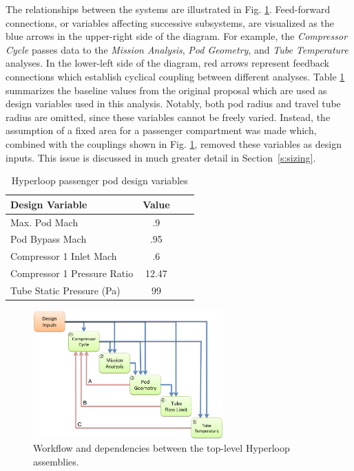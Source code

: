 \documentclass[heading.tex]{subfiles}
\begin{document}
The relationships between the systems are illustrated in Fig. \ref{f:hyperloopXDSM}. 
Feed-forward connections, or variables affecting successive subsystems,
are visualized as the blue arrows in the upper-right side of the diagram.
For example, the \textit{Compressor Cycle} passes data to the \textit{Mission Analysis},
\textit{Pod Geometry}, and \textit{Tube Temperature} analyses.
In the lower-left side of the diagram, red arrows represent feedback connections which establish cyclical coupling between different analyses.
Table \ref{tab:desvars} summarizes the baseline values from the original proposal which are used as design variables used in this analysis.
Notably, both pod radius and travel tube radius are omitted, since these variables cannot be freely varied.
Instead, the assumption of a fixed area for a passenger compartment was made which,
combined with the couplings shown in Fig. \ref{f:hyperloopXDSM}, removed these variables as design inputs.
This issue is discussed in much greater detail in Section~\ref{s:sizing}.

\begin{table}
    \centering
    \caption{Hyperloop passenger pod design variables}
    \label{tab:desvars}
    \begin{tabular}{l  c  c  c} 
        \hline \hline
        Design Variable &  Value\\ \hline \hline
        Max. Pod Mach & .9 \\ 
        Pod Bypass Mach & .95\\
        Compressor 1 Inlet Mach & .6\\ 
        Compressor 1 Pressure Ratio & 12.47\\ 
        Tube Static Pressure (Pa) & 99 \\ \hline
    \end{tabular}
\end{table}

\begin{figure}[hbtp]
\centering
\includegraphics[width=0.65\textwidth]{images/TopAssembly.png}
\caption{Workflow and dependencies between the top-level Hyperloop assemblies.}
\label{f:hyperloopXDSM}
\end{figure}
\end{document}
